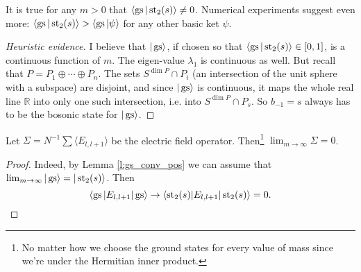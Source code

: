 \begin{conj}
It is true for any $m > 0$ that $\langle \operatorname{gs}|\operatorname{st}_2(s)\rangle \neq 0$. Numerical experiments suggest even more: $\langle \operatorname{gs} | \operatorname{st}_2(s)\rangle > \langle \operatorname{gs} | \psi \rangle$ for any other basic ket $\psi$.
\end{conj}
\begin{proof}[Heuristic evidence]
I believe that $|\operatorname{gs}\rangle$, if chosen so that $\langle \operatorname{gs} | \operatorname{st}_2(s)\rangle \in [0,1]$, is a continuous function of $m$. The eigen-value $\lambda_1$ is continuous as well. But recall that $P = P_1 \oplus \cdots \oplus P_n$. The sets $S^{\dim P} \cap P_i$ (an intersection of the unit sphere with a subspace) are disjoint, and since $|\operatorname{gs}\rangle$ is continuous, it maps the whole real line $\mathbb R$ into only one such intersection, i.e. into $S^{\dim P} \cap P_s$. So $b_{-1} = s$ always has to be the bosonic state for $|\operatorname{gs}\rangle$.
\end{proof}

\begin{proposition}
Let $\Sigma = N^{-1}\sum \langle E_{l,l+1} \rangle$ be the electric field operator. Then\footnote{No matter how we choose the ground states for every value of mass since we're under the Hermitian inner product.} $\lim_{m \rightarrow \infty} \Sigma = 0$.
\end{proposition}
\begin{proof}
Indeed, by Lemma \ref{l:gs_conv_pos} we can assume that $\lim_{m \rightarrow \infty} |\operatorname{gs}\rangle = |\operatorname{st}_2(s)\rangle$. Then 
\[
\langle \operatorname{gs} | E_{l,l+1} | \operatorname{gs} \rangle \rightarrow \langle \operatorname{st}_2(s) | E_{l,l+1}|\operatorname{st}_2(s)\rangle = 0.\qedhere
\]
\end{proof}

